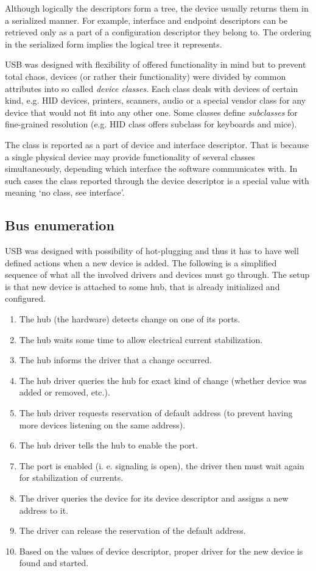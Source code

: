 Although logically the descriptors form a tree, the device usually returns them
in a serialized manner. For example, interface and endpoint descriptors can be
retrieved only as a part of a configuration descriptor they belong to. The
ordering in the serialized form implies the logical tree it represents.

USB was designed with flexibility of offered functionality in mind but to
prevent total chaos, devices (or rather their functionality) were divided by
common attributes into so called \textit{device classes}. Each class deals with
devices of certain kind, e.g. HID devices, printers, scanners, audio or a
special vendor class for any device that would not fit into any other one. Some
classes define \textit{subclasses} for fine-grained resolution (e.g. HID class
offers subclass for keyboards and mice).

The class is reported as a part of device and interface descriptor. That is
because a single physical device may provide functionality of several classes
simultaneously, depending which interface the software communicates with. In
such cases the class reported through the device descriptor is a special value
with meaning ‘no class, see interface’.

\subsection{Bus enumeration}

USB was designed with possibility of hot-plugging and thus it has to have well
defined actions when a new device is added. The following is a simplified
sequence of what all the involved drivers and devices must go through. The
setup is that new device is attached to some hub, that is already initialized
and configured.

\begin{enumerate}
\item The hub (the hardware) detects change on one of its ports.
\item The hub waits some time to allow electrical current stabilization.
\item The hub informs the driver that a change occurred.
\item The hub driver queries the hub for exact kind of change (whether device
was added or removed, etc.).
\item The hub driver requests reservation of default address (to prevent having
more devices listening on the same address).
\item The hub driver tells the hub to enable the port.
\item The port is enabled (i. e. signaling is open), the driver then must wait
again for stabilization of currents.
\item The driver queries the device for its device descriptor and assigns a new
address to it.
\item The driver can release the reservation of the default address.
\item Based on the values of device descriptor, proper driver for the new
device is found and started.
\end{enumerate}

